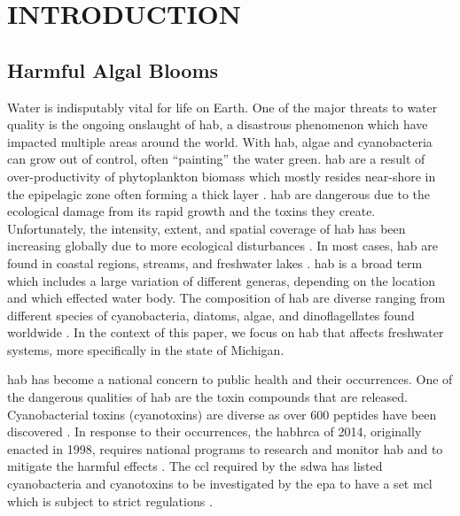 \chapter{INTRODUCTION}
\section{Harmful Algal Blooms}

Water is indisputably vital for life on Earth. One of the major threats to water quality is the ongoing onslaught of \gls{hab}, a disastrous phenomenon which have impacted multiple areas around the world. With \gls{hab}, algae and cyanobacteria can grow out of control, often ``painting'' the water green. \gls{hab} are a result of over-productivity of phytoplankton biomass which mostly resides near-shore in the epipelagic zone often forming a thick layer \cite{moore_richard_cyanobacterial_1993}.  \gls{hab} are dangerous due to the ecological damage from its rapid growth and the toxins they create. Unfortunately, the intensity, extent, and spatial coverage of \gls{hab} has been increasing globally due to more ecological disturbances \cite{codd_cyanobacterial_1999}. In most cases, \gls{hab} are found in coastal regions, streams, and freshwater lakes \cite{rastogi_cyanotoxin-microcystins:_2014}. \gls{hab} is a broad term which includes a large variation of different generas, depending on the location and which effected water body. The composition of \gls{hab} are diverse ranging from  different species of cyanobacteria, diatoms, algae, and dinoflagellates found worldwide \cite{dittmann_cyanobacterial_2012}. In the context of this paper, we focus on \gls{hab} that affects freshwater systems, more specifically in the state of Michigan.

\gls{hab} has become a national concern to public health and their occurrences. One of the dangerous qualities of \gls{hab} are the toxin compounds that are released. Cyanobacterial toxins (cyanotoxins) are diverse as over 600 peptides have been discovered \cite{welker_cyanobacterial_2006}. In response to their occurrences, the \gls{habhrca} of 2014, originally enacted in 1998, requires national programs to research and monitor \gls{hab} and to mitigate the harmful effects \cite{noauthor_harmful_2014}. The \gls{ccl} required by the \gls{sdwa} has listed cyanobacteria and cyanotoxins to be investigated by the \gls{epa} to have a set \gls{mcl} which is subject to strict regulations \cite{usepa_drinking_2016}. 

